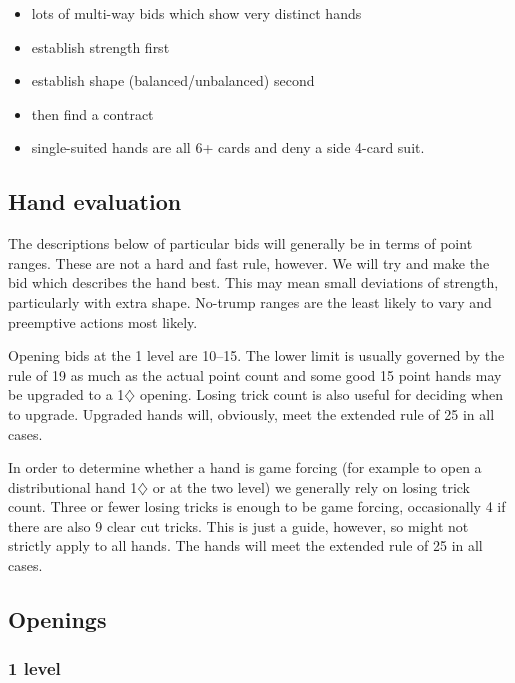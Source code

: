 \documentclass[a4paper,14pt]{extarticle}
\begin{document}
\begin{itemize}
\item lots of multi-way bids which show very distinct hands
\item establish strength first
\item establish shape (balanced/unbalanced) second
\item then find a contract
\item single-suited hands are all 6+ cards and deny a side 4-card suit.
\end{itemize}

\subsection{Hand evaluation}

The descriptions below of particular bids will generally be in terms of point
ranges. These are not a hard and fast rule, however. We will try and make the
bid which describes the hand best. This may mean small deviations of strength, 
particularly with extra shape. No-trump ranges are the least likely to vary and
preemptive actions most likely.

Opening bids at the 1 level are 10--15. The lower limit is usually governed by
the rule of 19 as much as the actual point count and some good 15 point hands
may be upgraded to a 1$\diamondsuit$ opening. Losing trick count is also 
useful for deciding when to upgrade. Upgraded hands will, obviously, meet the
extended rule of 25 in all cases. 

In order to determine whether a hand is game forcing (for example to open a
distributional hand 1$\diamondsuit$ or at the two level) we generally
rely on losing trick count. Three or fewer losing tricks is enough to be game
forcing, occasionally 4 if there are also 9 clear cut tricks. This is just a
guide, however, so might not strictly apply to all hands. The hands will meet
the extended rule of 25 in all cases.

\newpage

\subsection{Openings}
\label{sec:openings}

\subsubsection{1 level}
\label{sec:open:1level}
\end{document}
